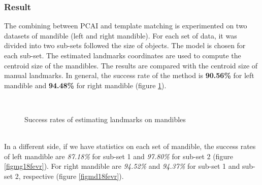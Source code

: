 \subsubsection{Result}
The combining between PCAI and template matching is experimented on two datasets of mandible (left and right mandible). For each set of data, it was divided into two sub-sets followed the size of objects. The model is chosen for each sub-set. The estimated landmarks coordinates are used to compute the centroid size of the mandibles. The results are compared with the centroid size of manual landmarks. In general, the success rate of the method is \textbf{90.56\%} for left mandible and \textbf{94.48\%} for right mandible (figure \ref{figm18fevr}). \\[0.2cm]
\begin{figure}[h!]
\centering
{}~~
\caption{Success rates of estimating landmarks on mandibles}
\label{figm18fevr}
\end{figure}~\\
In a different side, if we have statistics on each set of mandible, the success rates of left mandible are \textit{87.18\%} for sub-set 1 and \textit{97.80\%} for sub-set 2 (figure \ref{figmg18fevr}). For right mandible are \textit{94.52\%} and \textit{94.37\%} for sub-set 1 and sub-set 2, respective (figure \ref{figmd18fevr}).
